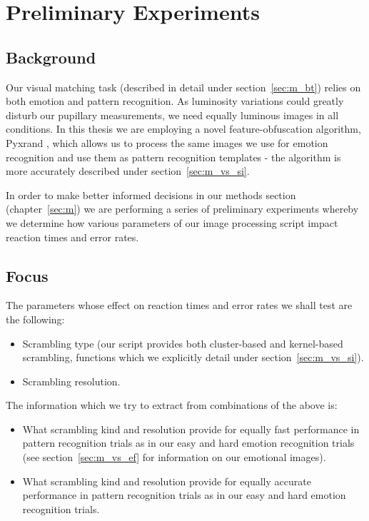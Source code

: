 \chapter{Preliminary Experiments}\label{sec:pe}
    \section{Background}\label{sec:pa_s}
	Our visual matching task (described in detail under section~\ref{sec:m_bt}) relies on both emotion and pattern recognition.
	As luminosity variations could greatly disturb our pupillary measurements, we need equally luminous images in all conditions.
	In this thesis we are employing a novel feature-obfuscation algorithm, Pyxrand \citep{pyxrand}, which allows us to process the same images we use for emotion recognition and use them as pattern recognition templates - the algorithm is more accurately described under section~\ref{sec:m_vs_si}.
	
	In order to make better informed decisions in our methods section (chapter~\ref{sec:m}) we are performing a series of preliminary experiments whereby we determine how various parameters of our image processing script impact reaction times and error rates.
    \section{Focus}
	The parameters whose effect on reaction times and error rates we shall test are the following:
	\begin{itemize}
	    \item Scrambling type (our script provides both cluster-based and kernel-based scrambling, functions which we explicitly detail under section~\ref{sec:m_vs_si}).
	    \item Scrambling resolution.
	\end{itemize}
	The information which we try to extract from combinations of the above is:
	\begin{itemize}
	    \item What scrambling kind and resolution provide for equally fast performance in pattern recognition trials as in our easy and hard emotion recognition trials (see section~\ref{sec:m_vs_ef} for information on our emotional images).
	    \item What scrambling kind and resolution provide for equally accurate performance in pattern recognition trials as in our easy and hard emotion recognition trials.
	\end{itemize}

